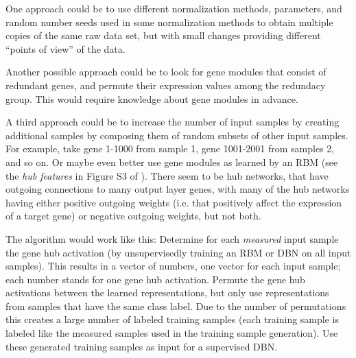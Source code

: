 One approach could be to use different normalization methods, parameters,
and random number seeds used in some normalization methods to obtain
multiple copies of the same raw data set, but with small changes providing
different ``points of view'' of the data.

Another possible approach could be to look for gene modules that consist
of redundant genes, and permute their expression values among the
redundacy group. This would require knowledge about gene modules in
advance.

A third approach could be to increase the number of input samples
by creating additional samples by composing them of random subsets
of other input samples. For example, take gene 1-1000 from sample
1, gene 1001-2001 from samples 2, and so on. Or maybe even better
use gene modules as learned by an RBM (see the \emph{hub features
}in Figure S3 of \cite{ChenXie2015}). There seem to be hub networks,
that have outgoing connections to many output layer genes, with many
of the hub networks having either positive outgoing weights (i.e.
that positively affect the expression of a target gene) or negative
outgoing weights, but not both.

The algorithm would work like this: Determine for each \emph{measured}
input sample the gene hub activation (by unsupervisedly training an
RBM or DBN on all input samples). This results in a vector of numbers,
one vector for each input sample; each number stands for one gene
hub activation. Permute the gene hub activations between the learned
representations, but only use representations from samples that have
the same class label. Due to the number of permutations this creates
a large number of labeled training samples (each training sample is
labeled like the measured samples used in the training sample generation).
Use these generated training samples as input for a supervised DBN.



